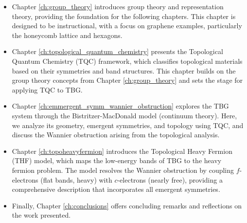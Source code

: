 \begin{itemize}
\item Chapter \ref{ch:group_theory} introduces group theory and representation theory, providing the foundation for the following chapters. This chapter is designed to be instructional, with a focus on graphene examples, particularly the honeycomb lattice and hexagons.

\item Chapter \ref{ch:topological_quantum_chemistry} presents the Topological Quantum Chemistry (TQC) framework, which classifies topological materials based on their symmetries and band structures. This chapter builds on the group theory concepts from Chapter \ref{ch:group_theory} and sets the stage for applying TQC to TBG.

\item Chapter \ref{ch:emmergent_symm_wannier_obstruction} explores the TBG system through the Bistritzer-MacDonald model (continuum theory). Here, we analyze its geometry, emergent symmetries, and topology using TQC, and discuss the Wannier obstruction arising from the topological analysis.

\item Chapter \ref{ch:topoheavyfermion} introduces the Topological Heavy Fermion (THF) model, which maps the low-energy bands of TBG to the heavy fermion problem. The model resolves the Wannier obstruction by coupling $f$-electrons (flat bands, heavy) with $c$-electrons (nearly free), providing a comprehensive description that incorporates all emergent symmetries.

\item Finally, Chapter \ref{ch:conclusions} offers concluding remarks and reflections on the work presented.
\end{itemize}





%
%
%
